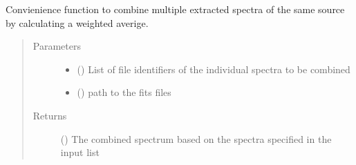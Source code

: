\documentclass[a4paper,11pt,english]{sphinxmanual}
\begin{document}

\begin{fulllineitems}
\label{\detokenize{cascade.exoplanet_tools:cascade.exoplanet_tools.exoplanet_tools.combine_spectra}}
Convienience function to combine multiple extracted spectra
of the same source by calculating a weighted averige.
\begin{quote}\begin{description}
\item[{Parameters}] \leavevmode\begin{itemize}
\item {} 
 () \textendash{} List of file identifiers of the individual spectra to be combined

\item {} 
 () \textendash{} path to the fits files

\end{itemize}

\item[{Returns}] \leavevmode
{} () \textendash{} The combined spectrum based on the spectra specified in the input list

\end{description}\end{quote}

\end{fulllineitems}

\end{document}
